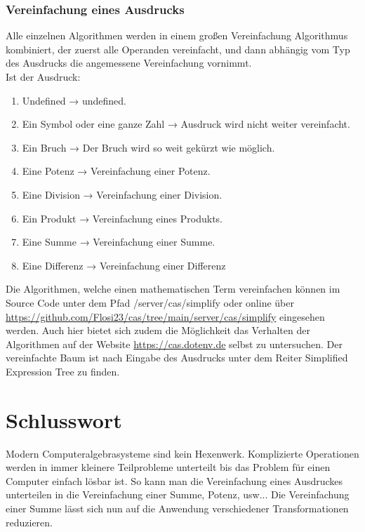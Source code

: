 \documentclass[11pt]{article}
\begin{document}
\subsubsection{Vereinfachung eines Ausdrucks}
Alle einzelnen Algorithmen werden in einem großen Vereinfachung Algorithmus kombiniert, 
der zuerst alle Operanden vereinfacht, und dann abhängig vom Typ des Ausdrucks die angemessene Vereinfachung vornimmt. \\
\newline
Ist der Ausdruck:
\begin{enumerate}
  \item Undefined → undefined.
  \item Ein Symbol oder eine ganze Zahl → Ausdruck wird nicht weiter vereinfacht.
  \item Ein Bruch → Der Bruch wird so weit gekürzt wie möglich.
  \item Eine Potenz → Vereinfachung einer Potenz.
  \item Eine Division → Vereinfachung einer Division.
  \item Ein Produkt → Vereinfachung eines Produkts.
  \item Eine Summe → Vereinfachung einer Summe.
  \item Eine Differenz → Vereinfachung einer Differenz
\end{enumerate}

Die Algorithmen, welche einen mathematischen Term vereinfachen können im Source Code unter
dem Pfad /server/cas/simplify oder online über \url{https://github.com/Flosi23/cas/tree/main/server/cas/simplify}
eingesehen werden.
Auch hier bietet sich zudem die Möglichkeit das Verhalten der Algorithmen auf der Website 
\url{https://cas.dotenv.de} selbst zu untersuchen. Der vereinfachte Baum ist nach Eingabe des
Ausdrucks unter dem Reiter \glqq Simplified Expression Tree\grqq{} zu finden.

\section{Schlusswort}

Modern Computeralgebrasysteme sind kein Hexenwerk. Komplizierte Operationen 
werden in immer kleinere Teilprobleme unterteilt bis das 
Problem für einen Computer einfach lösbar ist. So kann man die Vereinfachung eines
Ausdruckes unterteilen in die Vereinfachung einer Summe, Potenz, usw... Die Vereinfachung
einer Summe lässt sich nun auf die Anwendung verschiedener Transformationen reduzieren.\\
\end{document}
